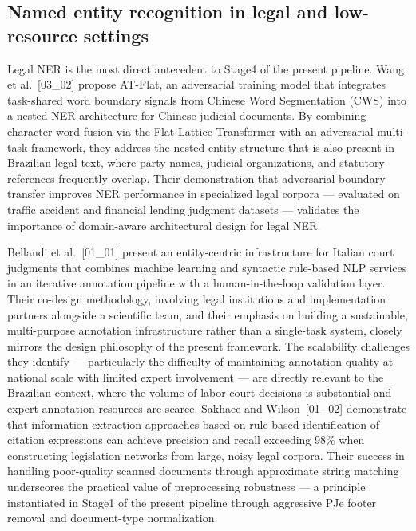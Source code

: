 \documentclass[preprint,a4paper,fleqn]{cas-dc}
\begin{document}
\subsection{Named entity recognition in legal and low-resource settings}

Legal NER is the most direct antecedent to Stage4 of the present pipeline. Wang et al.~[03\_02] propose AT-Flat, an adversarial training model that integrates task-shared word boundary signals from Chinese Word Segmentation (CWS) into a nested NER architecture for Chinese judicial documents. By combining character-word fusion via the Flat-Lattice Transformer with an adversarial multi-task framework, they address the nested entity structure that is also present in Brazilian legal text, where party names, judicial organizations, and statutory references frequently overlap. Their demonstration that adversarial boundary transfer improves NER performance in specialized legal corpora — evaluated on traffic accident and financial lending judgment datasets — validates the importance of domain-aware architectural design for legal NER.

Bellandi et al.~[01\_01] present an entity-centric infrastructure for Italian court judgments that combines machine learning and syntactic rule-based NLP services in an iterative annotation pipeline with a human-in-the-loop validation layer. Their co-design methodology, involving legal institutions and implementation partners alongside a scientific team, and their emphasis on building a sustainable, multi-purpose annotation infrastructure rather than a single-task system, closely mirrors the design philosophy of the present framework. The scalability challenges they identify — particularly the difficulty of maintaining annotation quality at national scale with limited expert involvement — are directly relevant to the Brazilian context, where the volume of labor-court decisions is substantial and expert annotation resources are scarce. Sakhaee and Wilson~[01\_02] demonstrate that information extraction approaches based on rule-based identification of citation expressions can achieve precision and recall exceeding 98\% when constructing legislation networks from large, noisy legal corpora. Their success in handling poor-quality scanned documents through approximate string matching underscores the practical value of preprocessing robustness — a principle instantiated in Stage1 of the present pipeline through aggressive PJe footer removal and document-type normalization.
\end{document}
